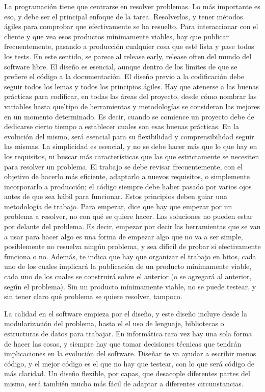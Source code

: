 La programación tiene que centrarse en resolver problemas. Lo más importante es eso, y debe ser el principal enfoque de la tarea. Resolverlos, y tener métodos ágiles para comprobar que efectivamente se ha resuelto.
Para interaccionar con el cliente y que vea esos productos mínimamente viables, hay que publicar frecuentemente, pasando a producción cualquier cosa que esté lista y pase todos los tests. En este sentido, se parece al release early, release often del mundo del software libre.
El diseño es esencial, aunque dentro de los límites de que se prefiere el código a la documentación. El diseño previo a la codificación debe seguir todos los lemas y todos los principios ágiles.
Hay que atenerse a las buenas prácticas para codificar, en todas las áreas del proyecto, desde cómo nombrar las variables hasta que’tipo de herramientas y metodologías se consideran las mejores en un momento determinado. Es decir, cuando se comience un proyecto debe de dedicarse cierto tiempo a establecer cuales son esas buenas prácticas. En la evolución del mismo, será esencial para su flexibilidad y comprensibilidad seguir las mismas.
La simplicidad es esencial, y no se debe hacer más que lo que hay en los requisitos, ni buscar más características que las que estrictamente se necesiten para resolver un problema.
El trabajo se debe revisar frecuentemente, con el objetivo de hacerlo más eficiente, adaptarlo a nuevos requisitos, o simplemente incorporarlo a producción; el código siempre debe haber pasado por varios ojos antes de que sea hábil para funcionar.
Estos principios deben guiar una metodología de trabajo. Para empezar, dice que hay que empezar por un problema a resolver, no con qué se quiere hacer. Las soluciones no pueden estar por delante del problema. Es decir, empezar por decir las herramientas que se van a usar para hacer algo es una forma de empezar algo que no va a ser simple, posiblemente no resuelva ningún problema, y sea difícil de probar si efectivamente funciona o no. Además, te indica que hay que organizar el trabajo en hitos, cada uno de los cuales implicará la publicación de un producto mínimamente viable, cada uno de los cuales se construirá sobre el anterior (o se agregará al anterior, según el problema). Sin un producto mínimamente viable, no se puede testear, y sin tener claro qué problema se quiere resolver, tampoco.

La calidad en el software empieza por el diseño, y este diseño incluye desde la modularización del problema, hasta el el uso de lenguaje, bibliotecas o estructuras de datos para trabajar. En informática rara vez hay una sola forma de hacer las cosas, y siempre hay que tomar decisiones técnicas que tendrán implicaciones en la evolución del software. Diseñar te va ayudar a escribir menos código, y el mejor código es el que no hay que testear, con lo que será código de más claridad. Un diseño flexible, por capas, que desacople diferentes partes del mismo, será también mucho más fácil de adaptar a diferentes circunstancias.


